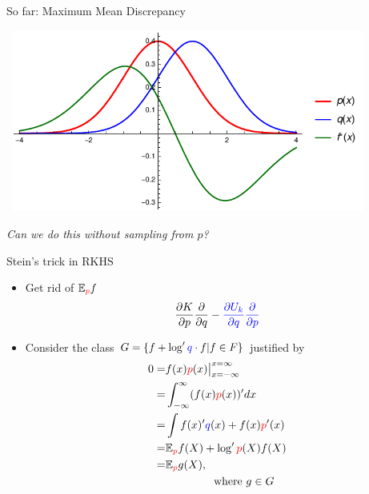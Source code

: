 \begin{frame}
\begin{columns}
\begin{column}{.33\linewidth}
\begin{block}{So far: Maximum Mean Discrepancy}
\begin{minipage}{.35\linewidth}
\begin{center}
\includegraphics[width=12cm,height=6cm]{./img/mmd.pdf}
\end{center}
\end{minipage}
\vspace{1cm}
\begin{center}
\emph{Can we do this without sampling from $p$?}
\end{center}
\end{block}
\vspace{-0.75cm}
\begin{block}{Stein's trick in RKHS}
\begin{itemize}
\item Get rid of $\mathbb{E}_{{\color{red} p}}f$  
\begin{align*}
\frac{\partial K}{\partial p}\frac{\partial}{\partial q}-\color{blue}{\frac{\partial U_k}{\partial q}}\frac{\partial}{\partial p}
\end{align*}
 \item Consider the  class $G = \{ f  +  \log' { \color{blue} q} \cdot  f | f \in F \}$ justified by 
\begin{align*}
 0= &  f(x) {\color{red} p}(x)  \big|_{x=-\infty}^{x=\infty} \\
   = &  \int_{-\infty}^{\infty} (f(x) {\color{red} p}(x) )'  dx \\
   = &  \int   f(x)' { \color{blue} q}(x)   + f(x){\color{red} p}'(x)  \\
   = &  \mathbb{E}_{\color{red} p} f(X)  +  \log' {\color{red} p}(X) f(X) \\
   = & \mathbb{E}_{\color{red} p} g(X), \\
    & \quad \quad \quad  \quad  \text{ where } g \in G
\end{align*}
\end{itemize}
\end{block}
\vspace{-0.75cm}

\end{column}
\end{columns}
\end{frame}
